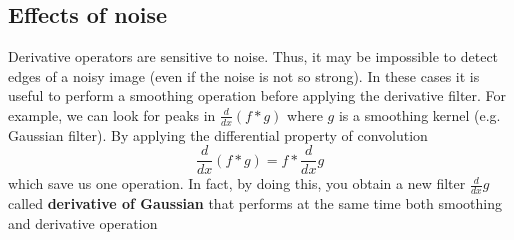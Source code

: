 \subsection{Effects of noise}
Derivative operators are sensitive to noise. Thus, it may be impossible to detect edges of a noisy image (even if the noise is not so strong).
In these cases it is useful to perform a smoothing operation before applying the derivative filter.\newline
For example, we can look for peaks in $\frac{d}{dx}(f * g)$ where $g$ is a smoothing kernel (e.g. Gaussian filter). By applying the differential property of convolution
\[\frac{d}{dx}(f * g) = f * \frac{d}{dx}g\]
which save us one operation. In fact, by doing this, you obtain a new filter $ \frac{d}{dx}g$ called \textbf{derivative of Gaussian} that performs at the same time both smoothing and derivative operation
